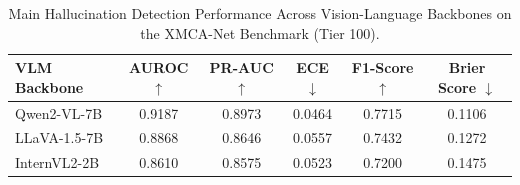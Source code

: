 \begin{table}[t]
\centering
\small
\caption{Main Hallucination Detection Performance Across Vision-Language Backbones on the XMCA-Net Benchmark (Tier 100).}
\label{tab:main_detection}
\begin{tabular}{lccccc}
\toprule
\textbf{VLM Backbone} & \textbf{AUROC} $\uparrow$ & \textbf{PR-AUC} $\uparrow$ & \textbf{ECE} $\downarrow$ & \textbf{F1-Score} $\uparrow$ & \textbf{Brier Score} $\downarrow$ \\
\midrule
Qwen2-VL-7B & 0.9187 & 0.8973 & 0.0464 & 0.7715 & 0.1106 \\
LLaVA-1.5-7B & 0.8868 & 0.8646 & 0.0557 & 0.7432 & 0.1272 \\
InternVL2-2B & 0.8610 & 0.8575 & 0.0523 & 0.7200 & 0.1475 \\
\bottomrule
\end{tabular}
\end{table}